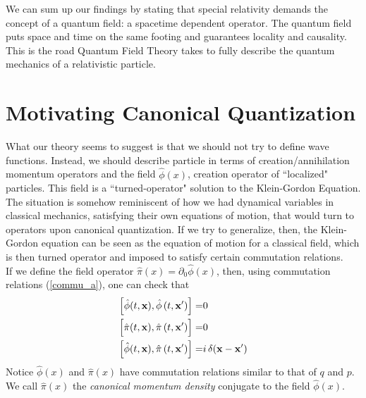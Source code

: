 We can sum up our findings by stating that special relativity demands the concept of a quantum field: a spacetime dependent operator. The quantum field puts space and time on the same footing and guarantees locality and causality. This is the road Quantum Field Theory takes to fully describe the quantum mechanics of a relativistic particle.


\section{Motivating Canonical Quantization}

What our theory seems to suggest is that we should not try to define wave functions. Instead, we should describe particle in terms of creation/annihilation momentum operators and the field $\hat{\phi}(x)$, creation operator of ``localized" particles. This field is a ``turned-operator" solution to the Klein-Gordon Equation. The situation is somehow reminiscent of how we had dynamical variables in classical mechanics, satisfying their own equations of motion, that would turn to operators upon canonical quantization. If we try to generalize, then, the Klein-Gordon equation can be seen as the equation of motion for a classical field, which is then turned operator and imposed to satisfy certain commutation relations.\\

 If we define the field operator $\hat{\pi}(x)=\partial_0\hat{\phi}(x)$, then, using commutation relations (\ref{commu_a}), one can check that
\begin{equation}
\begin{aligned}
\comm{\hat{\phi}(t,\mathbf{x})}{ \hat{\phi}\left( t,\mathbf{x}^{\prime}\right)}=&0 \\
\comm\Big{\hat{\pi}(t,\mathbf{x})}{ \hat{\pi}\left( t,\mathbf{x}^{\prime}\right)}=&0\\
\left[\hat{\phi}(t,\mathbf{x}), \hat{\pi}\left( t,\mathbf{x}^{\prime}\right)\right]=&i\, \delta(\mathbf{x}-\mathbf{x}^{\prime})
\end{aligned}
\label{commu_fields1}
\end{equation}
Notice $\hat{\phi}(x)$ and $\hat{\pi}(x)$ have commutation relations similar to that of $q$ and $p$. We call $\hat{\pi}(x)$ the \textit{canonical momentum density} conjugate to the field $\hat{\phi}(x)$.\\


